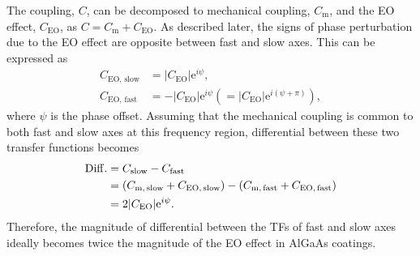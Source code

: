 The coupling, $C$, can be decomposed to mechanical coupling, $C_{\mathrm{m}}$, and the EO effect, $C_{\mathrm{EO}}$, as $C=C_{\mathrm{m}}+C_{\mathrm{EO}}$.
As described later, the signs of phase perturbation due to the EO effect are opposite between fast and slow axes.
This can be expressed as
\begin{align}
    C_{\mathrm{EO,\,slow}} &= |C_{\mathrm{EO}}|\mathrm{e}^{i\psi}, \\
    C_{\mathrm{EO,\,fast}} &= -|C_{\mathrm{EO}}|\mathrm{e}^{i\psi} \left(=|C_{\mathrm{EO}}|\mathrm{e}^{i(\psi+\pi)}\right),
\end{align}
where $\psi$ is the phase offset.
Assuming that the mechanical coupling is common to both fast and slow axes at this frequency region, differential between these two transfer functions becomes
\begin{align}
    \mathrm{Diff.} &= C_{\mathrm{slow}} - C_{\mathrm{fast}}  \notag \\
    &= \left(C_{\mathrm{m,\,slow}}+C_{\mathrm{EO,\,slow}}\right) - \left(C_{\mathrm{m,\,fast}}+C_{\mathrm{EO,\,fast}}\right) \notag \\
    &= 2|C_{\mathrm{EO}}|\mathrm{e}^{i\psi}.
\end{align}
Therefore, the magnitude of differential between the TFs of fast and slow axes ideally becomes twice the magnitude of the EO effect in AlGaAs coatings.

